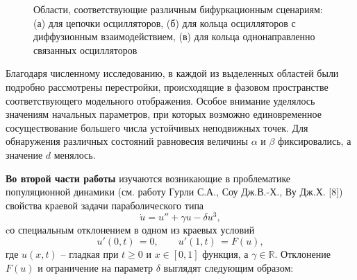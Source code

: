 \documentclass[12pt]{extarticle}
\begin{document}
\begin{figure}[h]
\begin{minipage}[h]{0.2\linewidth}
\end{minipage}
\hspace{2.3cm}
\begin{minipage}[h]{0.2\linewidth}
\end{minipage}
\caption{ Области, соответствующие различным бифуркационным сценариям: (а) для цепочки осцилляторов, (б) для кольца осцилляторов с диффузионным взаимодействием, (в) для кольца однонаправленно связанных осцилляторов }
\end{figure}

Благодаря численному исследованию, в каждой из выделенных областей были подробно рассмотрены перестройки, происходящие в фазовом пространстве соответствующего модельного отображения. Особое внимание уделялось значениям начальных параметров, при которых возможно единовременное сосуществование большего числа устойчивых неподвижных точек. Для обнаружения различных состояний равновесия величины $ \alpha $ и $ \beta $ фиксировались, а значение $ d $ менялось.

\textbf{Во второй части работы} изучаются возникающие в проблематике популяционной динамики (см. работу Гурли С.А., Соу Дж.В.-Х., Ву Дж.Х. [8]) свойства краевой задачи параболического типа
\begin{equation}\label{boundary_problem}
	\dot u = u'' + \gamma u - \delta u^3,	
\end{equation}
cо специальным отклонением в одном из краевых условий
\begin{equation}\label{boundary_cond}	
	u'(0, t) \, = 0, \qquad u'(1, t) \, = F(u),
\end{equation}
где $ u(x, t) $ -- гладкая при $ t \geqslant 0 $ и $ x \in [0, 1] $ функция, а $ \gamma \in \mathbb{R} $. Отклонение $ F(u) $ и ограничение на параметр $ \delta $ выглядят следующим образом:
\end{document}
